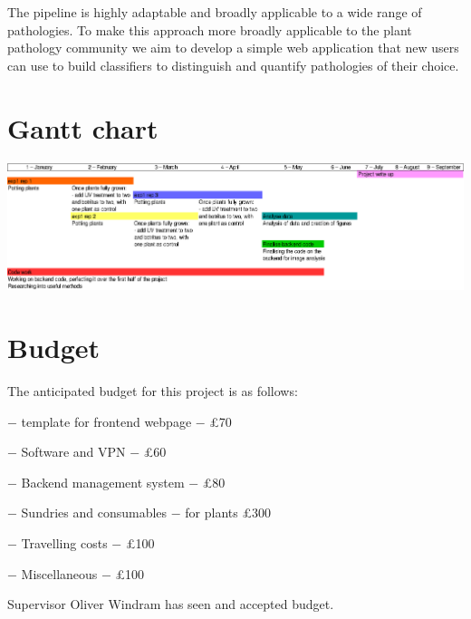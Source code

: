 \documentclass[a4paper]{article}
\begin{document}
    The pipeline is highly adaptable and broadly applicable to a wide range of pathologies. To make this approach more 
    broadly applicable to the plant pathology community we aim to develop a simple web application that new users
    can use to build classifiers to distinguish and quantify pathologies of their choice.
    
	
	\section{Gantt chart}
	\includegraphics[width =\textwidth]{gantt_chart.eps}
	
	\section{Budget}
	
	The anticipated budget for this project is as follows:
	\vspace{2mm}
	
	$-$ template for frontend webpage $-$ \pounds70
	\vspace{3mm}
	
    $-$ Software and VPN $-$ \pounds60
    \vspace{3mm}
  
    $-$ Backend management system $-$ \pounds80 
    \vspace{3mm}
  
    $-$ Sundries and consumables $-$ for plants \pounds300
    \vspace{3mm}
  
    $-$ Travelling costs $-$ \pounds100
    \vspace{3mm}
  
    $-$ Miscellaneous $-$ \pounds100
    \vspace{2mm}
    
    Supervisor Oliver Windram has seen and accepted budget.
  
  \printbibliography
\end{document}
